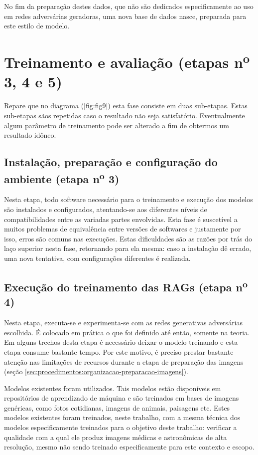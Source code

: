 No fim da preparação destes dados, que não são dedicados especificamente ao uso em redes adversárias geradoras, uma nova base de dados nasce, preparada para este estilo de modelo.

\section{Treinamento e avaliação (etapas n\textsuperscript{o} 3, 4 e 5)}
\label{sec:procedimentos:treinamento-avaliacao}

Repare que no diagrama (\ref{fig:fig9}) esta fase consiste em duas sub-etapas. Estas sub-etapas sãos repetidas caso o resultado não seja satisfatório. Eventualmente algum parâmetro de treinamento pode ser alterado a fim de obtermos um resultado idôneo.

\subsection{Instalação, preparação e configuração do ambiente (etapa n\textsuperscript{o} 3)}

Nesta etapa, todo software necessário para o treinamento e execução dos modelos são instalados e configurados, atentando-se aos diferentes níveis de compatibilidades entre as variadas partes envolvidas. Esta fase é suscetível a muitos problemas de equivalência entre versões de softwares e justamente por isso, erros são comuns nas execuções. Estas dificuldades são as razões por trás do laço superior nesta fase, retornando para ela mesma: caso a instalação dê errado, uma nova tentativa, com configurações diferentes é realizada.

\subsection{Execução do treinamento das RAGs (etapa n\textsuperscript{o} 4)}

Nesta etapa, executa-se e experimenta-se com as redes generativas adversárias escolhida. É colocado em prática o que foi definido até então, somente na teoria. Em alguns trechos desta etapa é necessário deixar o modelo treinando e esta etapa consume bastante tempo. Por este motivo, é preciso prestar bastante atenção nas limitações de recursos durante a etapa de preparação das imagens (seção \ref{sec:procedimentos:organizacao-preparacao-imagens}). 

Modelos existentes foram utilizados. Tais modelos estão disponíveis em repositórios de aprendizado de máquina e são treinados em bases de imagens genéricas, como fotos cotidianas, imagens de animais, paisagens etc. Estes modelos existentes foram treinados, neste trabalho, com a mesma técnica dos modelos especificamente treinados para o objetivo deste trabalho: verificar a qualidade com a qual ele produz imagens médicas e astronômicas de alta resolução, mesmo não sendo treinado especificamente para este contexto e escopo.

